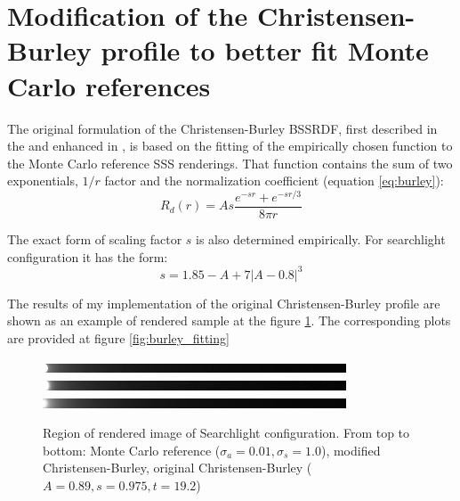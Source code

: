 \section{Modification of the Christensen-Burley profile to better fit Monte
Carlo references}
\label{section:cb_modification}
The original formulation of the Christensen-Burley BSSRDF, first described in the
\cite{Burley:disney_siggraph15} and enhanced in \cite{Christensen:2015:ARP:2775280.2792555}, is
based on the fitting of the empirically chosen function to the Monte Carlo reference SSS renderings.
That function contains the sum of two exponentials, $1/r$ factor and the normalization coefficient
(equation \ref{eq:burley}):
\[ R_d(r) = As\dfrac{e^{-sr}+e^{-sr/3}}{8\pi r} \]

The exact form of scaling factor $s$ is also determined empirically. For searchlight configuration 
it has the form:
\begin{equation}
\label{eq:cb_scaling}
s=1.85-A + 7|A - 0.8|^3
\end{equation}

The results of my implementation of the original Christensen-Burley profile are shown as an example
of rendered sample at the figure \ref{fig:burley_searchlight_renders}. The corresponding plots are
provided at figure \ref{fig:burley_fitting}

\begin{figure}[h]
    \centering
    \includegraphics[width=256pt,trim={0 0 256 0},clip]{imgs/renders/cb_montecarlo_slice}
    \includegraphics[width=256pt,trim={0 0 256 0},clip]{imgs/renders/cb_modified_slice}
    \includegraphics[width=256pt,trim={0 0 256 0},clip]{imgs/renders/cb_original_slice}
    \caption{Region of rendered image of Searchlight configuration. From top to bottom: Monte Carlo
    reference ($\sigma_a=0.01, \sigma_s=1.0$), modified Christensen-Burley, original
    Christensen-Burley ($A=0.89, s=0.975, t=19.2$)}
    \label{fig:burley_searchlight_renders}
\end{figure}


